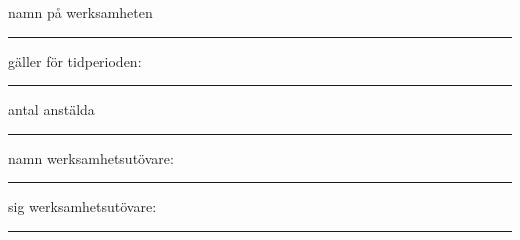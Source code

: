 \documentclass{letter}
\begin{document}
namn på werksamheten
\vspace*{1cm}
\hrule
gäller för tidperioden:
\vspace*{1cm}
\hrule
antal anstälda
\vspace*{1cm}
\hrule





\normalsize

\vfill

namn werksamhetsutövare:
\vspace*{1cm}
\hrule
sig werksamhetsutövare:
\vspace*{1cm}
\hrule
\end{document}
